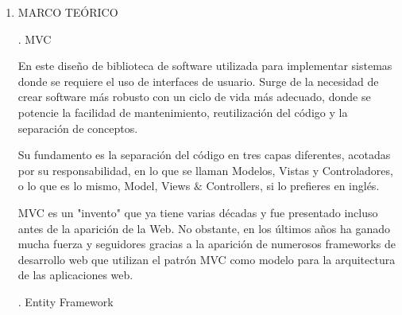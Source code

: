 \documentclass[12pt]{article}
\begin{document}
\begin{enumerate}[label*=\arabic*.]
\begin{adjustwidth}{0.35in}{0.0in}
\end{adjustwidth}

\vspace{\baselineskip}

    \item MARCO TEÓRICO \par
    
\vspace{\baselineskip}

{\fontsize{13pt}{15.6pt}. MVC\par}\par

\begin{adjustwidth}{0.35in}{0.0in}
{\fontsize{13pt}{15.6pt}\selectfont En este diseño de biblioteca de software utilizada para implementar sistemas donde se requiere el uso de interfaces de usuario. Surge de la necesidad de crear software más robusto con un ciclo de vida más adecuado, donde se potencie la facilidad de mantenimiento, reutilización del código y la separación de conceptos.\par}\par

{\fontsize{13pt}{15.6pt}\selectfont Su fundamento es la separación del código en tres capas diferentes, acotadas por su responsabilidad, en lo que se llaman Modelos, Vistas y Controladores, o lo que es lo mismo, Model, Views $\&$  Controllers, si lo prefieres en inglés. \par}\par

{\fontsize{13pt}{15.6pt}\selectfont MVC es un "invento" que ya tiene varias décadas y fue presentado incluso antes de la aparición de la Web. No obstante, en los últimos años ha ganado mucha fuerza y seguidores gracias a la aparición de numerosos frameworks de desarrollo web que utilizan el patrón MVC como modelo para la arquitectura de las aplicaciones web.\par}\par

\end{adjustwidth}

{\fontsize{13pt}{15.6pt}. Entity Framework \par}\par


\end{enumerate}
\end{document}
